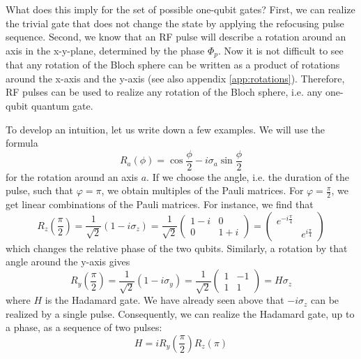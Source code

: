 \documentclass[a4paper, draft]{article}
\theoremstyle{own}
\theoremstyle{remark}
\begin{document}
What does this imply for the set of possible one-qubit gates? First, we can realize the trivial gate that does not change the state by applying the refocusing pulse sequence. Second, we know that an RF pulse will describe a rotation around an axis in the x-y-plane, determined by the phase $\Phi_p$. Now it is not difficult to see that any rotation of the Bloch sphere can be written as a product of rotations around the x-axis and the y-axis (see also appendix \ref{app:rotations}). Therefore, RF pulses can be used to realize any rotation of the Bloch sphere, i.e. any one-qubit quantum gate. 

To develop an intuition, let us write down a few examples. We will use the formula
$$
R_a(\phi) = \cos \frac{\phi}{2} - i \sigma_a \sin \frac{\phi}{2}
$$
for the rotation around an axis $a$. If we choose the angle, i.e. the duration of the pulse, such that $\varphi = \pi$, we obtain multiples of the Pauli matrices.  For $\varphi = \frac{\pi}{2}$, we get linear combinations of the Pauli matrices. For instance, we find that
$$
R_z(\frac{\pi}{2}) = \frac{1}{\sqrt{2}} (1 - i \sigma_z) = 
\frac{1}{\sqrt{2}}
\begin{pmatrix}
1 - i & 0 \\
0 & 1 + i
\end{pmatrix}
= 
\begin{pmatrix}
e^{-i\frac{\pi}{4}} & \\
& e^{i\frac{\pi}{4}}
\end{pmatrix}
$$
which changes the relative phase of the two qubits. Similarly, a rotation by that angle around the y-axis gives
$$
R_y(\frac{\pi}{2}) = \frac{1}{\sqrt{2}} (1 - i \sigma_y) = 
\frac{1}{\sqrt{2}}
\begin{pmatrix}
	1  & -1 \\
	1 & 1
\end{pmatrix} = H \sigma_z
$$
where $H$ is the Hadamard gate. We have already seen above that $-i\sigma_z$ can be realized by a single pulse. Consequently, we can realize the Hadamard gate, up to a phase, as a sequence of two pulses:
$$
H = i R_y(\frac{\pi}{2}) R_z(\pi) 
$$
\end{document}
